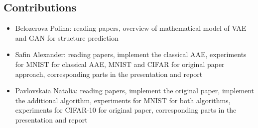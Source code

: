 \documentclass{article}
\begin{document}
    \subsection{Contributions}
    \begin{itemize}
        \item Belozerova Polina: reading papers, overview of mathematical model of VAE and GAN for structure prediction
        \item Safin Alexander: reading papers,
        implement the classical AAE,
        experiments for MNIST for classical AAE,
        MNIST and CIFAR for original paper approach,
        corresponding parts in the presentation and report
        \item Pavlovskaia Natalia: reading papers,
        implement the original paper,
        implement the additional algorithm,
        experiments for MNIST for both algorithms,
        experiments for CIFAR-10 for original paper,
        corresponding parts in the presentation and report
    \end{itemize}

    
    
\end{document}
